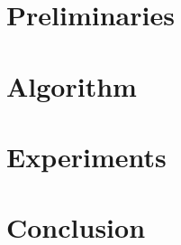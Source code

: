 \documentclass{llncs}
\begin{document}
\section{Preliminaries}
\label{sec:model}




\section{Algorithm}
\label{sec:algo}

 



\section{Experiments}
\label{sec:experiments}


%


\section{Conclusion}
\label{sec:conclusion}






%
\end{document}
